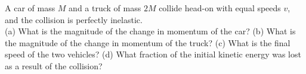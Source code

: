 A car of mass $M$ and a truck of mass $2M$ collide head-on with
equal speeds $v$, and the collision is perfectly inelastic.\\
%
(a) What is the magnitude of the change in momentum of the
car?\answercheck\hwendpart
%
(b) What is the magnitude of the change in momentum of the
truck?\answercheck\hwendpart
%
(c) What is the final speed of the two vehicles?\answercheck\hwendpart
%
(d) What fraction of the initial kinetic energy was lost as a result
of the collision?\answercheck
